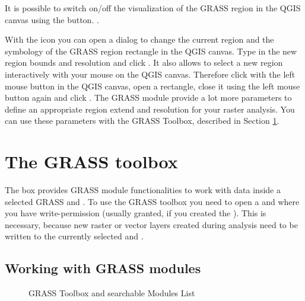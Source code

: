It is possible to switch on/off the visualization of the GRASS region in the
QGIS canvas using the 
button. .

With the  icon you 
can open a dialog to change the current region and the symbology of the GRASS 
region rectangle in the QGIS canvas. Type in the new region bounds and 
resolution and click . It also allows to select a new region 
interactively with your mouse on the QGIS canvas. Therefore click with the 
left mouse button in the QGIS canvas, open a rectangle, close it using the 
left mouse button again and click .
The GRASS module  provide a lot more parameters to define 
an appropriate region extend and resolution for your raster analysis. You can 
use these parameters with the GRASS Toolbox, described in Section 
\ref{subsec:grass_toolbox}.

\section{The GRASS toolbox}\label{subsec:grass_toolbox}

The  box provides GRASS module 
functionalities to work with data inside a selected GRASS  
and . To use the GRASS toolbox you need to open a 
 and  where you have write-permission 
(usually granted, if you created the ). This is necessary, 
because new raster or vector layers created during analysis need to be written 
to the currently selected  and .

\subsection{Working with GRASS modules}\label{grass_modules}

\begin{figure}[ht]
\centering
   \hspace{0.5cm}
\caption{GRASS Toolbox and searchable Modules List \nixcaption}\label{fig:grass_modules}
\end{figure}

